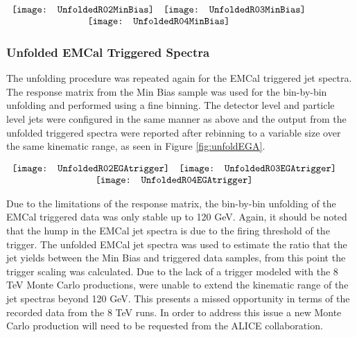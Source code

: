 \begin{figure*}[t!]
$\begin{array}{rl}
    \texttt{[image: UnfoldedR02MinBias]} &
    \texttt{[image: UnfoldedR03MinBias]}\\
    \multicolumn{2}{c}{\texttt{[image: UnfoldedR04MinBias]}}
\end{array}$
\caption[Corrected Jet Spectra to Monte Carlo level for R = 0.2, R=0.3, and R = 0.4 jets.]{\label{fig:unfoldMinbias}Unfolded Min Bias Jet Spectra with correction factors, $C_{MC}$, for R = 0.2, R=0.3, and R = 0.4 jets.}
\end{figure*}

\subsubsection{Unfolded EMCal Triggered Spectra}
The unfolding procedure was repeated again for the EMCal triggered jet spectra.  The response matrix from the Min Bias sample was used for the bin-by-bin unfolding and performed using a fine binning.  The detector level and particle level jets were configured in the same manner as above and the output from the unfolded triggered spectra were reported after rebinning to a variable size over the same kinematic range, as seen in Figure \ref{fig:unfoldEGA}.

\begin{figure*}[t!]
$\begin{array}{rl}
    \texttt{[image: UnfoldedR02EGAtrigger]} &
    \texttt{[image: UnfoldedR03EGAtrigger]}\\
    \multicolumn{2}{c}{\texttt{[image: UnfoldedR04EGAtrigger]}}
\end{array}$
\caption[Corrected EMCal Triggered Jet Spectra to Monte Carlo level for R = 0.2, R=0.3, and R = 0.4 jets.]{\label{fig:unfoldEGA}Unfolded EMCal Triggered Jet Spectra with correction factors, $C_{MC}$, for R = 0.2, R=0.3, and R = 0.4 jets.}
\end{figure*}


Due to the limitations of the response matrix, the bin-by-bin unfolding of the EMCal triggered data was only stable up to 120 GeV.  Again, it should be noted that the hump in the EMCal jet spectra is due to the firing threshold of the trigger.  The unfolded EMCal jet spectra was used to estimate the ratio that the jet yields between the Min Bias and triggered data samples, from this point the trigger scaling was calculated.  Due to the lack of a trigger modeled with the 8 TeV Monte Carlo productions, were unable to extend the kinematic range of the jet spectras beyond 120 GeV.  This presents a missed opportunity in terms of the recorded data from the 8 TeV runs.  In order to address this issue a new Monte Carlo production will need to be requested from the ALICE collaboration.

